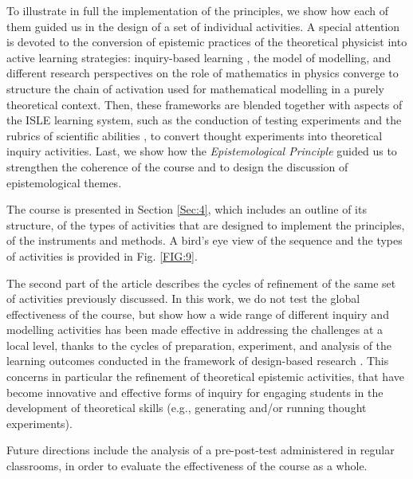 \documentclass[twocolumn,secnumarabic,amssymb, nobibnotes, aps, prd, nofootinbib]{revtex4-2}
\begin{document}
To illustrate in full the implementation of the principles, we show how each of them guided us in the design of a set of individual activities. A special attention is devoted to the conversion of epistemic practices of the theoretical physicist into active learning strategies: inquiry-based learning \cite{Llewellyn2012}, the model of modelling, and different research perspectives on the role of mathematics in physics \cite{Uhden2012, Redish2015} converge to structure the chain of activation used for mathematical modelling in a purely theoretical context. Then, these frameworks are blended together with aspects of the ISLE learning system, such as the conduction of testing experiments and the rubrics of scientific abilities \cite{Etkina2006, Etkina2015}, to convert thought experiments into theoretical inquiry activities. Last, we show how the \emph{Epistemological Principle} guided us to strengthen the coherence of the course and to design the discussion of epistemological themes.

The course is presented in Section \ref{Sec:4}, which includes an outline of its structure, of the types of activities that are designed to implement the principles, of the instruments and methods. A bird's eye view of the sequence and the types of activities is provided in Fig. \ref{FIG:9}.

The second part of the article describes the cycles of refinement of the same set of activities previously discussed. In this work, we do not test the global effectiveness of the course, but show how a wide range of different inquiry and modelling activities has been made effective in addressing the challenges at a local level, thanks to the cycles of preparation, experiment, and analysis of the learning outcomes conducted in the framework of design-based research \cite{Bakker2015}. This concerns in particular the refinement of theoretical epistemic activities, that have become innovative and effective forms of inquiry for engaging students in the development of theoretical skills (e.g., generating and/or running thought experiments).

Future directions include the analysis of a pre-post-test administered in regular classrooms, in order to evaluate
the effectiveness of the course as a whole.
\end{document}
